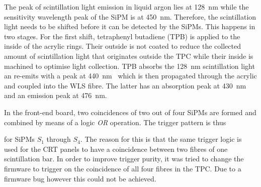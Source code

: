 The peak of scintillation light emission in liquid argon lies at \SI{128}{\nano\metre} while the sensitivity wavelength peak of the SiPM is at \SI{450}{\nano\metre}.
Therefore, the scintillation light needs to be shifted before it can be detected by the SiPMs.
This happens in two stages.
For the first shift, tetraphenyl butadiene (TPB) is applied to the inside of the acrylic rings.
Their outside is not coated to reduce the collected amount of scintillation light that originates outside the TPC while their inside is machined to optimise light collection.
TPB absorbs the \SI{128}{\nano\metre} scintillation light an re-emits with a peak at \SI{440}{\nano\metre}~\cite{tpb} which is then propagated through the acrylic and coupled into the WLS fibre.
The latter has an absorption peak at \SI{430}{\nano\metre} and an emission peak at \SI{476}{\nano\metre}.

In the front-end board, two coincidences of two out of four SiPMs are formed and combined by means of a logic \emph{OR} operation.
The trigger pattern is thus
for SiPMs $S_1$ through $S_4$.
The reason for this is that the same trigger logic is used for the CRT panels to have a coincidence between two fibres of one scintillation bar.
In order to improve trigger purity, it was tried to change the firmware to trigger on the coincidence of all four fibres in the TPC.
Due to a firmware bug however this could not be achieved.


\section{\AL{}}
\label{sec:light-ro_arclight}

\todo[inline, color=red]{\AL{}}
